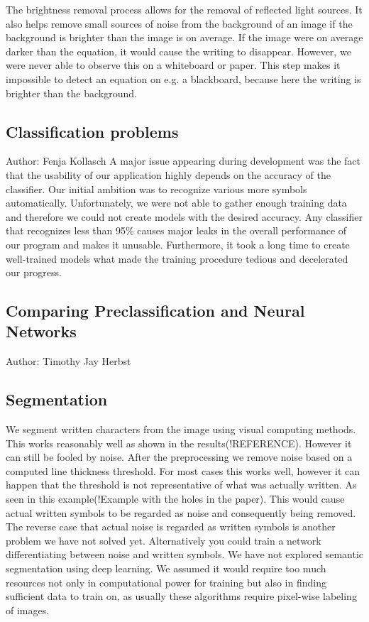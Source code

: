 \documentclass[12pt]{article}
\begin{document}
	The brightness removal process allows for the removal of reflected light sources.
	It also helps remove small sources of noise from the background of an image if the background is brighter than the image is on average.
	If the image were on average darker than the equation, it would cause the writing to disappear.
	However, we were never able to observe this on a whiteboard or paper.
	This step makes it impossible to detect an equation on e.g. a blackboard, because here the writing is brighter than the background.
	
	
	
	
	
	
	
	
	
	\subsection{Classification problems}
	\small{Author: Fenja Kollasch} \newline \newline
	A major issue appearing during development was the fact that the usability of our application highly depends on the accuracy of the classifier. Our initial ambition was to recognize various more symbols automatically. Unfortunately, we were not able to gather enough training data and therefore we could not create models with the desired accuracy. Any classifier that recognizes less than 95\% causes major leaks in the overall performance of our program and makes it unusable. Furthermore, it took a long time to create well-trained models what made the training procedure tedious and decelerated our progress.
	
	\subsection{Comparing Preclassification and Neural Networks}
	\small{Author: Timothy Jay Herbst} \newline \newline
	
	\subsection{Segmentation}
	We segment written characters from the image using visual computing methods. This works reasonably well as shown in the results(!REFERENCE). However it can still be fooled by noise. After the preprocessing we remove noise based on a computed line thickness threshold. For most cases this works well, however it can happen that the threshold is not representative of what was actually written. As seen in this example(!Example with the holes in the paper). This would cause actual written symbols to be regarded as noise and consequently being removed. The reverse case that actual noise is regarded as written symbols is another problem we have not solved yet. Alternatively you could train a network differentiating between noise and written symbols. We have not explored semantic segmentation using deep learning. We assumed it would require too much resources not only in computational power for training but also in finding sufficient data to train on, as usually these algorithms require pixel-wise labeling of images.
	
\end{document}

